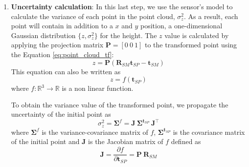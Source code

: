 \begin{enumerate}
    \item \textbf{Uncertainty calculation}:
        In this last step, we use the sensor's model to calculate the variance
        of each point in the point cloud, $\sigma^2_z$.
        As a result, each point will contain in addition to a $x$ and $y$
        position, a one-dimensional Gaussian distribution $\{z, \sigma^2_z\}$
        for the height.
        The $z$ value is calculated by applying the projection matrix
        $\mathbf{P} = [0 \ 0 \ 1]$ to the transformed point using the Equation
        \ref{eq:point_cloud_tf}:
        \begin{equation}
            z = \mathbf{P}(
                \mathbf{R}_{SM} \mathbf{t}_{SP} -
                \mathbf{t}_{SM})
        \end{equation}
        This equation can also be written as
        \begin{equation}
            z = f(\mathbf{t}_{SP})
        \end{equation}
        where
        $f : \mathbb{R}^3 \rightarrow \mathbb{R}$ is a non linear function.

        To obtain the variance value of the transformed point, we propagate
        the uncertainty of the initial point as
        \begin{equation}
            \sigma^2_z = \mathbf{\Sigma}^f =
            \mathbf{J} \ \mathbf{\Sigma}^{\mathbf{t}_{SP}} \
            \mathbf{J}^\intercal
        \end{equation}
        where $\mathbf{\Sigma}^f$ is the variance-covariance matrix of $f$,
        $\mathbf{\Sigma}^{\mathbf{t}_{SP}}$ is the covariance matrix of
        the initial point and
        $\mathbf{J}$ is the Jacobian matrix of $f$ defined as
        \begin{equation}
            \mathbf{J} = \frac{\partial f}{\partial \mathbf{t}_{SP}} =
            \mathbf{P} \ \mathbf{R}_{SM}
        \end{equation}



\end{enumerate}
